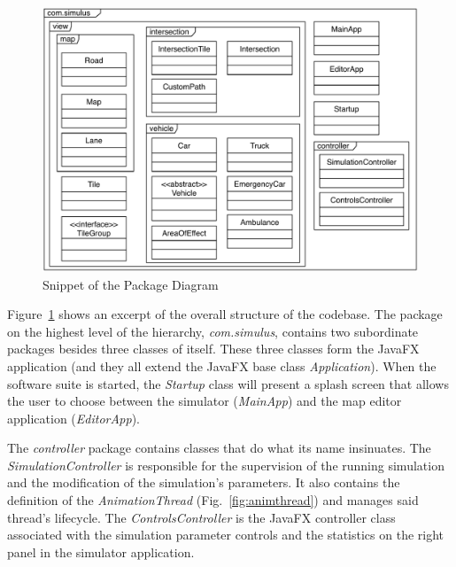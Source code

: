 \begin{figure}[t]
	\begin{center}
		\includegraphics[width=\textwidth]{img/package_diagram.pdf}
		\caption[Snippet of the Package Diagram]{Snippet of the Package Diagram}
		\label{fig:packages}
	\end{center}
\end{figure}

Figure~\ref{fig:packages} shows an excerpt of the overall structure of the codebase. The package on the highest level of the hierarchy, \textit{com.simulus}, contains two subordinate packages besides three classes of itself. These three classes form the JavaFX application (and they all extend the JavaFX base class \textit{Application}). When the software suite is started, the \textit{Startup} class will present a splash screen that allows the user to choose between the simulator (\textit{MainApp}) and the map editor application (\textit{EditorApp}).

The \textit{controller} package contains classes that do what its name insinuates. The \textit{SimulationController} is responsible for the supervision of the running simulation and the modification of the simulation's parameters.  It also contains the definition of the \textit{AnimationThread} (Fig.~\ref{fig:animthread}) and manages said thread's lifecycle. The \textit{ControlsController} is the JavaFX controller class associated with the simulation parameter controls and the statistics on the right panel in the simulator application. 

